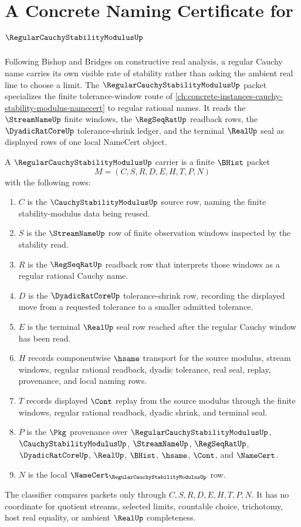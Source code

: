 \chapter{A Concrete Naming Certificate for $\RegularCauchyStabilityModulusUp$}
\label{ch:concrete-instances-regular-cauchy-stability-modulus-namecert}

Following Bishop and Bridges on constructive real analysis, a regular Cauchy name carries its own visible rate of stability rather than asking the ambient real line to choose a limit. The $\RegularCauchyStabilityModulusUp$ packet specializes the finite tolerance-window route of \autoref{ch:concrete-instances-cauchy-stability-modulus-namecert} to regular rational names. It reads the $\StreamNameUp$ finite windows, the $\RegSeqRatUp$ readback rows, the $\DyadicRatCoreUp$ tolerance-shrink ledger, and the terminal $\RealUp$ seal as displayed rows of one local NameCert object.

\begin{definition}
\label{def:regular-cauchy-stability-modulus-carrier}
A $\RegularCauchyStabilityModulusUp$ carrier is a finite $\BHist$ packet
$$
M=(C,S,R,D,E,H,T,P,N)
$$
with the following rows:
\begin{enumerate}
\item $C$ is the $\CauchyStabilityModulusUp$ source row, naming the finite stability-modulus data being reused.
\item $S$ is the $\StreamNameUp$ row of finite observation windows inspected by the stability read.
\item $R$ is the $\RegSeqRatUp$ readback row that interprets those windows as a regular rational Cauchy name.
\item $D$ is the $\DyadicRatCoreUp$ tolerance-shrink row, recording the displayed move from a requested tolerance to a smaller admitted tolerance.
\item $E$ is the terminal $\RealUp$ seal row reached after the regular Cauchy window has been read.
\item $H$ records componentwise $\hsame$ transport for the source modulus, stream windows, regular rational readback, dyadic tolerance, real seal, replay, provenance, and local naming rows.
\item $T$ records displayed $\Cont$ replay from the source modulus through the finite windows, regular rational readback, dyadic shrink, and terminal seal.
\item $P$ is the $\Pkg$ provenance over $\RegularCauchyStabilityModulusUp$, $\CauchyStabilityModulusUp$, $\StreamNameUp$, $\RegSeqRatUp$, $\DyadicRatCoreUp$, $\RealUp$, $\BHist$, $\hsame$, $\Cont$, and $\NameCert$.
\item $N$ is the local $\NameCert_{\RegularCauchyStabilityModulusUp}$ row.
\end{enumerate}
The classifier compares packets only through $C,S,R,D,E,H,T,P,N$. It has no coordinate for quotient streams, selected limits, countable choice, trichotomy, host real equality, or ambient $\RealUp$ completeness.
\end{definition}

